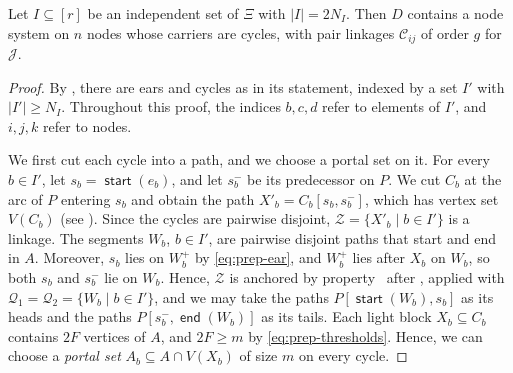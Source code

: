 \documentclass[fontsize=12pt,leading=14pt]{fullpaper}
\DeclareMathOperator{\st}{\mathsf{start}}
\DeclareMathOperator{\en}{\mathsf{end}}
\newcommand{\Ccal}{\mathcal{C}}
\newcommand{\Jcal}{\mathcal{J}}
\newcommand{\Qcal}{\mathcal{Q}}
\newcommand{\Zcal}{\mathcal{Z}}
\begin{document}
\begin{lemma}\label{lem:prep-closed}
  Let $I\subseteq[r]$ be an independent set of $\Xi$ with $|I|=2N_I$.
  Then $D$ contains a node system on $n$ nodes whose carriers are cycles, with pair linkages $\Ccal_{ij}$ of order $g$ for $\Jcal$.
\end{lemma}

\begin{proof}
  By , there are ears and cycles as in its statement, indexed by a set $I'$ with $|I'|\ge N_I$.
  Throughout this proof, the indices $b,c,d$ refer to elements of $I'$, and $i,j,k$ refer to nodes.

  We first cut each cycle into a path, and we choose a portal set on it.
  For every $b\in I'$, let $s_b=\st(e_b)$, and let $s_b^-$ be its predecessor on $P$.
  We cut $C_b$ at the arc of $P$ entering $s_b$ and obtain the path $X'_b=C_b[s_b,s_b^-]$, which has vertex set $V(C_b)$ (see ).
  Since the cycles are pairwise disjoint, $\Zcal=\{X'_b\mid b\in I'\}$ is a linkage.
  The segments $W_b$, $b\in I'$, are pairwise disjoint paths that start and end in $A$.
  Moreover, $s_b$ lies on $W_b^+$ by \eqref{eq:prep-ear}, and $W_b^+$ lies after $X_b$ on $W_b$, so both $s_b$ and $s_b^-$ lie on $W_b$.
  Hence, $\Zcal$ is anchored by property~ after , applied with $\Qcal_1=\Qcal_2=\{W_b\mid b\in I'\}$, and we may take the paths $P[\st(W_b),s_b]$ as its heads and the paths $P[s_b^-,\en(W_b)]$ as its tails.
  Each light block $X_b\subseteq C_b$ contains $2F$ vertices of $A$, and $2F\ge m$ by \eqref{eq:prep-thresholds}.
  Hence, we can choose a \emph{portal set} $A_b\subseteq A\cap V(X_b)$ of size $m$ on every cycle.


\end{proof}
\end{document}
